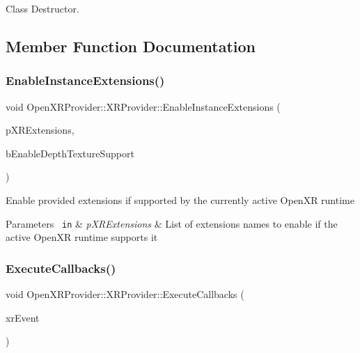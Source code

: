 Class Destructor. 



\subsection{Member Function Documentation}
\mbox{\label{class_open_x_r_provider_1_1_x_r_provider_acd79e785e586d9abcb47977e340a2739}} 
\subsubsection{\texorpdfstring{EnableInstanceExtensions()}{EnableInstanceExtensions()}}
{\footnotesize\ttfamily void Open\+X\+R\+Provider\+::\+X\+R\+Provider\+::\+Enable\+Instance\+Extensions (\begin{DoxyParamCaption}\item[{std\+::vector$<$ const char $\ast$ $>$ \&}]{p\+X\+R\+Extensions,  }\item[{bool}]{b\+Enable\+Depth\+Texture\+Support }\end{DoxyParamCaption})\hspace{0.3cm}{\ttfamily [private]}}

Enable provided extensions if supported by the currently active Open\+XR runtime 
\begin{DoxyParams}[1]{Parameters}
\mbox{\texttt{ in}}  & {\em p\+X\+R\+Extensions} & List of extensions names to enable if the active Open\+XR runtime supports it \\
\hline
\end{DoxyParams}
\mbox{\label{class_open_x_r_provider_1_1_x_r_provider_a3d9a3ea0c9f8830d17f87fa10424690c}} 
\subsubsection{\texorpdfstring{ExecuteCallbacks()}{ExecuteCallbacks()}}
{\footnotesize\ttfamily void Open\+X\+R\+Provider\+::\+X\+R\+Provider\+::\+Execute\+Callbacks (\begin{DoxyParamCaption}\item[{Xr\+Event\+Data\+Buffer}]{xr\+Event }\end{DoxyParamCaption})\hspace{0.3cm}{\ttfamily [private]}}

